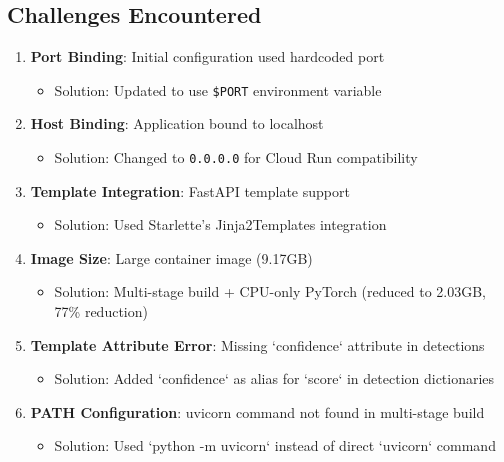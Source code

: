 \documentclass[12pt,a4paper]{article}
\begin{document}
\subsection{Challenges Encountered}
\begin{enumerate}
    \item \textbf{Port Binding}: Initial configuration used hardcoded port
    \begin{itemize}
        \item Solution: Updated to use \texttt{\$PORT} environment variable
    \end{itemize}
    
    \item \textbf{Host Binding}: Application bound to localhost
    \begin{itemize}
        \item Solution: Changed to \texttt{0.0.0.0} for Cloud Run compatibility
    \end{itemize}
    
    \item \textbf{Template Integration}: FastAPI template support
    \begin{itemize}
        \item Solution: Used Starlette's Jinja2Templates integration
    \end{itemize}
    
    \item \textbf{Image Size}: Large container image (9.17GB)
    \begin{itemize}
        \item Solution: Multi-stage build + CPU-only PyTorch (reduced to 2.03GB, 77\% reduction)
    \end{itemize}
    
    \item \textbf{Template Attribute Error}: Missing `confidence` attribute in detections
    \begin{itemize}
        \item Solution: Added `confidence` as alias for `score` in detection dictionaries
    \end{itemize}
    
    \item \textbf{PATH Configuration}: uvicorn command not found in multi-stage build
    \begin{itemize}
        \item Solution: Used `python -m uvicorn` instead of direct `uvicorn` command
    \end{itemize}
\end{enumerate}
\end{document}
